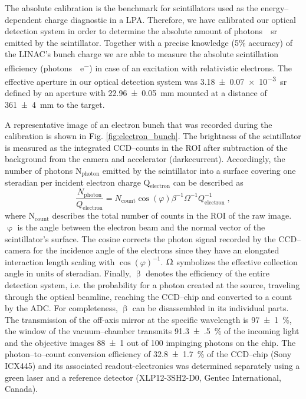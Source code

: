 \documentclass[%
reprint,
amsmath,
amssymb,
aip,
rsi, 
numerical,
floatfix,
]{revtex4-1}
\begin{document}
The absolute calibration is the benchmark for scintillators used as the energy--dependent charge diagnostic in a LPA.  
Therefore, we have calibrated our optical detection system in order to determine the absolute amount of \si[per-mode=symbol]{photons \per \steradian} emitted by the scintillator.
Together with a precise knowledge (5$\%$ accuracy) of the LINAC's bunch charge we are able to measure the absolute scintillation efficiency (\si[per-mode=symbol]{photons \per e^-}) in case of an excitation with relativistic electrons.
The effective aperture in our optical detection system was \SI[separate-uncertainty = true]{3.18(7)e-3}{\steradian} defined by an aperture with \SI[separate-uncertainty = true]{22.96(5)}{\milli\metre} mounted at a distance of \SI[separate-uncertainty = true]{361(4)}{\milli\metre} to the target.

A representative image of an electron bunch that was recorded during the calibration is shown in Fig. \ref{fig:electron_bunch}. 
The brightness of the scintillator is measured as the integrated CCD--counts in the ROI after subtraction of the background from the camera and accelerator (darkccurrent). 
Accordingly, the number of photons N$_{\text{photon}}$ emitted by the scintillator into a surface covering one steradian per incident electron charge Q$_{\text{electron}}$ can be described as
\begin{equation}
\frac{N_{\text{photon}}}{Q_{\text{electron}}} = N_{\text{count}}\cos(\varphi)\beta^{-1}\Omega^{-1}Q_{\text{electron}}^{-1}{\;,}
\label{eq:ac}
\end{equation}
where N$_{\text{count}}$ describes the total number of counts in the ROI of the raw image.
$\upvarphi$ is the angle between the electron beam and the normal vector of the scintillator's surface.
The cosine corrects the photon signal recorded by the CCD--camera for the incidence angle of the electrons since they have an elongated interaction length scaling with $\cos(\varphi)^{-1}$.
$\Upomega$ symbolizes the effective collection angle in units of steradian.
Finally, $\upbeta$ denotes the efficiency of the entire detection system, i.e. the probability for a photon created at the source, traveling through the optical beamline, reaching the CCD--chip and converted to a count by the ADC.
For completeness, $\upbeta$ can be disassembled in its individual parts. 
The transmission of the off-axis mirror at the specific wavelength is \SI[separate-uncertainty = true]{97(1)}{\%}, the window of the vacuum--chamber transmits \SI[separate-uncertainty = true]{91.3(5)}{\%} of the incoming light and the objective images \num[separate-uncertainty = true]{88(1)} out of 100 impinging photons on the chip.
The photon--to--count conversion efficiency of \SI[separate-uncertainty = true]{32.8(17)}{\%} of the CCD--chip (Sony ICX445) and its associated readout-electronics was determined separately using a green laser and a reference detector (XLP12-3SH2-D0, Gentec International, Canada).
\end{document}
